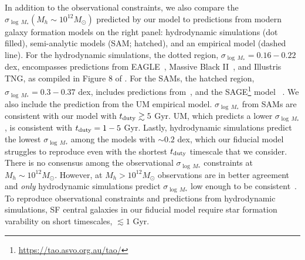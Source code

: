 \documentclass[12pt, letterpaper, preprint, tighten]{aastex62}
\newcommand{\edt}[1]{{\color{dred}{\bf} #1}}
\begin{document}
In addition to the observational constraints, we also compare the $\sigma_{\log\,M_*}(M_h \sim 10^{12}M_\odot)$ 
predicted by our model to predictions from modern galaxy formation models 
on the right panel: hydrodynamic simulations (dot filled), semi-analytic models 
(SAM; hatched), and an empirical model (dashed line). For the hydrodynamic simulations, 
the dotted region, $\sigma_{\log\,M_*} = 0.16 - 0.22$ dex, encompasses 
predictions from EAGLE~\citep{matthee2017}, Massive Black II~\citep{khandai2015}, 
and Illustris TNG, as compiled in Figure 8 of \cite{wechsler2018}. 
For the SAMs, the hatched region, $\sigma_{\log\,M_*} = 0.3 - 0.37$ dex,
includes predictions from~\cite{lu2014, somerville2012}, and the SAGE\footnote{\url{https://tao.asvo.org.au/tao/}}
model~\edt{\citep{croton2016}}. We also include the prediction from the 
\cite{behroozi2018} UM empirical model. $\sigma_{\log\,M_*}$ from SAMs are 
consistent with our model with $t_{\rm duty} \gtrsim 5$ Gyr. UM, which predicts 
a lower $\sigma_{\log\,M_*}$, is consistent with $t_{\rm duty} = 1 - 5$ Gyr. 
Lastly, hydrodynamic simulations predict the lowest $\sigma_{\log\,M_*}$ among 
the models 
\edt{with $\sim 0.2$ dex, which our fiducial model struggles to reproduce 
even with the shortest $t_{\rm duty}$ timescale that we consider. 
There is no consensus among the observational $\sigma_{\log\,M_*}$ constraints 
at $M_h \sim 10^{12} M_\odot$. However, at $M_h > 10^{12} M_\odot$ observations 
are in better agreement and {\em only} hydrodynamic simulations predict $\sigma_{\log\,M_*}$ 
low enough to be consistent~\citep{wechsler2018}. To reproduce observational 
constraints and predictions from hydrodynamic simulations, SF central galaxies 
in our fiducial model require star formation varability on short timescales, 
$\lesssim 1$ Gyr.}
\end{document}
